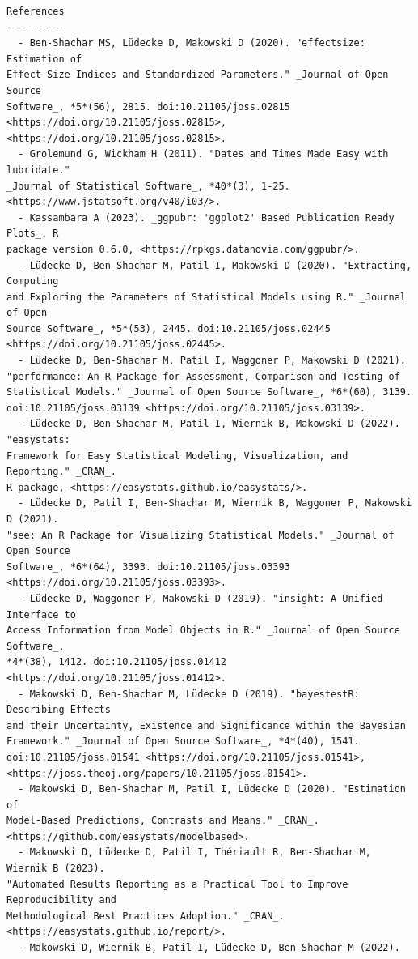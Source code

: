 \documentclass[
  10pt]{article}
\begin{document}
\begin{tcolorbox}[enhanced jigsaw, breakable, leftrule=.75mm, toprule=.15mm, colback=white, rightrule=.15mm, bottomrule=.15mm, opacityback=0, arc=.35mm, left=2mm, colframe=quarto-callout-color-frame]
\begin{verbatim}
References
----------
  - Ben-Shachar MS, Lüdecke D, Makowski D (2020). "effectsize: Estimation of
Effect Size Indices and Standardized Parameters." _Journal of Open Source
Software_, *5*(56), 2815. doi:10.21105/joss.02815
<https://doi.org/10.21105/joss.02815>, <https://doi.org/10.21105/joss.02815>.
  - Grolemund G, Wickham H (2011). "Dates and Times Made Easy with lubridate."
_Journal of Statistical Software_, *40*(3), 1-25.
<https://www.jstatsoft.org/v40/i03/>.
  - Kassambara A (2023). _ggpubr: 'ggplot2' Based Publication Ready Plots_. R
package version 0.6.0, <https://rpkgs.datanovia.com/ggpubr/>.
  - Lüdecke D, Ben-Shachar M, Patil I, Makowski D (2020). "Extracting, Computing
and Exploring the Parameters of Statistical Models using R." _Journal of Open
Source Software_, *5*(53), 2445. doi:10.21105/joss.02445
<https://doi.org/10.21105/joss.02445>.
  - Lüdecke D, Ben-Shachar M, Patil I, Waggoner P, Makowski D (2021).
"performance: An R Package for Assessment, Comparison and Testing of
Statistical Models." _Journal of Open Source Software_, *6*(60), 3139.
doi:10.21105/joss.03139 <https://doi.org/10.21105/joss.03139>.
  - Lüdecke D, Ben-Shachar M, Patil I, Wiernik B, Makowski D (2022). "easystats:
Framework for Easy Statistical Modeling, Visualization, and Reporting." _CRAN_.
R package, <https://easystats.github.io/easystats/>.
  - Lüdecke D, Patil I, Ben-Shachar M, Wiernik B, Waggoner P, Makowski D (2021).
"see: An R Package for Visualizing Statistical Models." _Journal of Open Source
Software_, *6*(64), 3393. doi:10.21105/joss.03393
<https://doi.org/10.21105/joss.03393>.
  - Lüdecke D, Waggoner P, Makowski D (2019). "insight: A Unified Interface to
Access Information from Model Objects in R." _Journal of Open Source Software_,
*4*(38), 1412. doi:10.21105/joss.01412 <https://doi.org/10.21105/joss.01412>.
  - Makowski D, Ben-Shachar M, Lüdecke D (2019). "bayestestR: Describing Effects
and their Uncertainty, Existence and Significance within the Bayesian
Framework." _Journal of Open Source Software_, *4*(40), 1541.
doi:10.21105/joss.01541 <https://doi.org/10.21105/joss.01541>,
<https://joss.theoj.org/papers/10.21105/joss.01541>.
  - Makowski D, Ben-Shachar M, Patil I, Lüdecke D (2020). "Estimation of
Model-Based Predictions, Contrasts and Means." _CRAN_.
<https://github.com/easystats/modelbased>.
  - Makowski D, Lüdecke D, Patil I, Thériault R, Ben-Shachar M, Wiernik B (2023).
"Automated Results Reporting as a Practical Tool to Improve Reproducibility and
Methodological Best Practices Adoption." _CRAN_.
<https://easystats.github.io/report/>.
  - Makowski D, Wiernik B, Patil I, Lüdecke D, Ben-Shachar M (2022).

\end{verbatim}
\end{tcolorbox}
\end{document}
